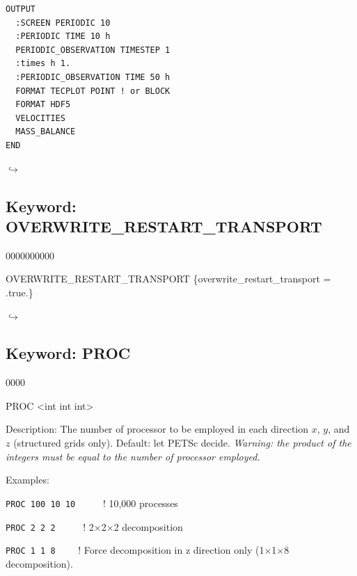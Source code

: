 \documentclass[12pt]{article}
\newcommand\return{{\hfill$\hookrightarrow$}}
\begin{document}

\begin{verbatim}
OUTPUT
  :SCREEN PERIODIC 10
  :PERIODIC TIME 10 h
  PERIODIC_OBSERVATION TIMESTEP 1
  :times h 1.
  :PERIODIC_OBSERVATION TIME 50 h
  FORMAT TECPLOT POINT ! or BLOCK
  FORMAT HDF5
  VELOCITIES
  MASS_BALANCE
END
\end{verbatim}

\hyperlink{target_key}{\return}


\newpage
\protect\hypertarget{target_overwrite}{}

\subsection{Keyword: OVERWRITE\_RESTART\_TRANSPORT}
\begin{deflist}{0000000000}
\item[OVERWRITE\_RESTART\_TRANSPORT] \{overwrite\_restart\_transport = .true.\}
\end{deflist}

\hyperlink{target_key}{\return}


\newpage
\protect\hypertarget{target_proc}{}

\subsection{Keyword: PROC}

\begin{deflist}{0000}
\item[PROC] <int int int> 
\item[Description:] The number of processor to be employed in each direction $x$, $y$, and $z$ (structured grids only). Default: let PETSc decide. {\em Warning: the product of the integers must be equal to the number of processor employed.}
\item[Examples:] ~

{\tt PROC 100 10 10} \ \ \ \ \ ! 10,000 processes

{\tt PROC 2 2 2} \ \ \ \ \ ! 2$\times$2$\times$2 decomposition

{\tt PROC 1 1 8} \ \ \ \ ! Force decomposition in z direction only (1$\times$1$\times$8 decomposition).
\end{deflist}
\end{document}
